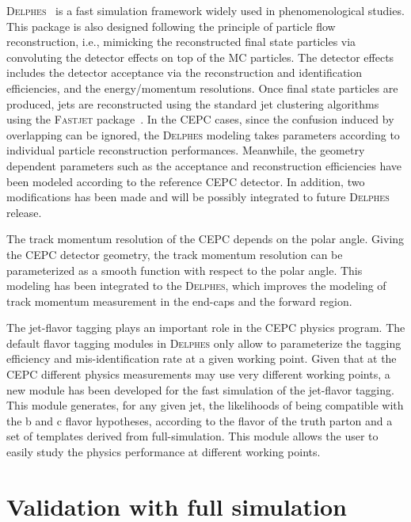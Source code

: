 \documentclass[a4paper,10pt,twoside]{cpc-hepnp}
\begin{document}
\begin{multicols}{2}
{\textsc{Delphes}~}\cite{ref:delphes} is a fast simulation framework widely used in phenomenological studies. 
This package is also designed following the principle of particle flow reconstruction, i.e., mimicking the reconstructed final state particles via convoluting the detector effects on top of the MC particles. 
The detector effects includes the detector acceptance via the reconstruction and identification efficiencies, and the energy/momentum resolutions. 
Once final state particles are produced, jets are reconstructed using the standard jet clustering algorithms using the {\textsc{Fastjet}} package~\cite{FastJet}.
In the CEPC cases, since the confusion induced by overlapping can be ignored, the {\textsc{Delphes}} modeling takes parameters according to individual particle reconstruction performances. 
Meanwhile, the geometry dependent parameters such as the acceptance and reconstruction efficiencies have been modeled according to the reference CEPC detector. 
In addition, two modifications has been made and will be possibly integrated to future {\textsc{Delphes}} release. 

The track momentum resolution of the CEPC depends on the polar angle. %
Giving the CEPC detector geometry, the track momentum resolution can be parameterized as a smooth function with respect to the polar angle. 
This modeling has been integrated to the {\textsc{Delphes}}, which improves the modeling of track momentum measurement in the end-caps and the forward region. 

The jet-flavor tagging plays an important role in the CEPC physics program. 
The default flavor tagging modules in {\textsc{Delphes}} only allow to parameterize the tagging efficiency and mis-identification rate at a given working point. 
Given that at the CEPC different physics measurements may use very different working points, a new module has been developed for the fast simulation of the jet-flavor tagging.
This module generates, for any given jet, the likelihoods of being compatible with the b and c flavor hypotheses, according to the flavor of the truth parton and a set of templates derived from full-simulation. 
This module allows the user to easily study the physics performance at different working points. 


\section{Validation with full simulation\label{sec:validation}}


\end{multicols}
\end{document}
